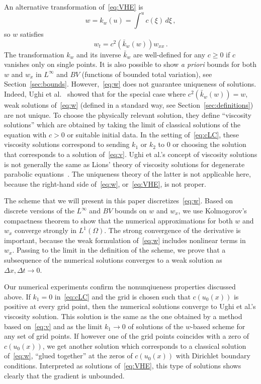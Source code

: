 \documentclass[11pt,leqno]{amsart}
\newcommand{\pt}[1]{#1_t}
\newcommand{\px}[1]{#1_x }
\newcommand{\pxx}[1]{#1_{xx}}
\begin{document}
An alternative transformation of~\eqref{eq:VHE} is
\begin{equation}\label{eq:wTrafo}
  w=k_w(u)=\int^u c(\xi)\,d\xi\,,
\end{equation} 
so $w$ satisfies
\begin{equation}\label{eq:w}
  \pt{w}=c^2(\bar{k}_w(w))\pxx{w}\,.
\end{equation}
The transformation $k_w$ and its inverse $\bar{k}_w$ are well-defined for any $c\ge 0$ if $c$ vanishes only on single points. It is also possible to show \emph{a priori} bounds for both $w$ and $\px{w}$ in $L^\infty$ and $BV$ (functions of bounded total variation), see  Section~\ref{sec:bounds}. However,~\eqref{eq:w} does not guarantee uniqueness of solutions. Indeed, Ughi et al.~\cite{Ughi1984,DalPassoLuckhaus1987,BertschDalPassoUghi1992} showed that for the special case where $c^2(\bar{k}_w(w))=w$, weak solutions of~\eqref{eq:w} (defined in a standard way, see Section~\ref{sec:definitions}) are not unique. To choose the physically relevant solution, they define ``viscosity solutions'' which are obtained by taking the limit of classical solutions of the equation with $c>0$ or suitable initial data. In the setting of~\eqref{eq:cLC}, these viscosity solutions correspond to sending $k_1$ or $k_2$ to $0$ or choosing the solution that corresponds to a solution of~\eqref{eq:v}.
Ughi et al.'s concept of viscosity solutions is not generally the same as Lions' theory of viscosity solutions for degenerate parabolic equations~\cite{CrandallIshiiLions1992,BertschDalPassoUghi1992}. The uniqueness theory of the latter is not applicable here, because the right-hand side of~\eqref{eq:w}, or~\eqref{eq:VHE}, is not proper.

The scheme that we will present in this paper discretizes~\eqref{eq:w}. Based on discrete versions of the $L^\infty$ and $BV$ bounds on $w$ and $\px{w}$, we use Kolmogorov's compactness theorem to show that the numerical approximations for both $w$ and $\px{w}$ converge strongly in $L^1(\Omega)$. The strong convergence of the derivative is important, because the weak formulation of~\eqref{eq:w} includes nonlinear terms in~$\px{w}$. Passing to the limit in the definition of the scheme, we prove that a subsequence of the numerical solutions converges to a weak solution as $\Delta x,\Delta t\rightarrow 0$.

Our numerical experiments confirm the nonunqiueness properties discussed above. If $k_1=0$ in~\eqref{eq:cLC} and the grid is chosen such that $c(u_0(x))$ is positive at every grid point, then the numerical solutions converge to Ughi et al.'s viscosity solution. This solution is the same as the one obtained by a method based on~\eqref{eq:v} and as the limit $k_1\rightarrow 0$ of solutions of the $w$-based scheme for any set of grid points. If however one of the grid points coincides with a zero of $c(u_0(x))$, we  get another solution which corresponds to a classical solution of~\eqref{eq:w}, ``glued together'' at the zeros of $c(u_0(x))$ with Dirichlet boundary conditions. Interpreted as solutions of~\eqref{eq:VHE}, this type of solutions shows clearly that the gradient is unbounded.
\end{document}
